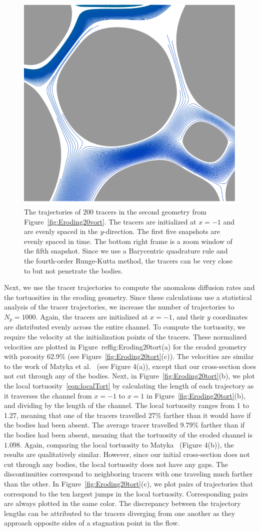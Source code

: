 \documentclass[preprint, 10pt]{elsarticle}
\begin{document}
\begin{figure}[H]
\begin{center}
\includegraphics[width = 0.32 \textwidth]{./figs/tracer_20b270_zoom}
\caption{\label{fig:Eroding20tracer}The trajectories of 200 tracers in
the second geometry from Figure~\ref{fig:Eroding20vort}. The tracers are
initialized at $x=-1$ and are evenly spaced in the $y$-direction. The
first five snapshots are evenly spaced in time.  The bottom right frame
is a zoom window of the fifth snapshot.  Since we use a Barycentric
quadrature rule and the fourth-order Runge-Kutta method, the tracers can
be very close to but not penetrate the bodies.}
\end{center}
\end{figure}

Next, we use the tracer trajectories to compute the anomalous diffusion
rates and the tortuosities in the eroding geometry.  Since these
calculations use a statistical analysis of the tracer trajectories, we
increase the number of trajectories to $N_p = 1000$.  Again, the tracers
are initialized at $x=-1$, and their $y$ coordinates are distributed
evenly across the entire channel.  To compute the tortuosity, we
require the velocity at the initialization points of the tracers.  These
normalized velocities are plotted in Figure~ref{fig:Eroding20tort}(a)
for the eroded geometry with porosity 62.9\% (see
Figure~\ref{fig:Eroding20tort}(c)).  The velocities are similar to the
work of Matyka et al.~\cite{matyka2008tortuosity} (see Figure 4(a)),
except that our cross-section does not cut through any of the bodies.
Next, in Figure~\ref{fig:Eroding20tort}(b), we plot the local
tortuosity~\eqref{eqn:localTort} by calculating the length of each
trajectory as it traverses the channel from $x=-1$ to $x=1$ in
Figure~\ref{fig:Eroding20tort}(b), and dividing by the length of the
channel.  The local tortuosity ranges from 1 to 1.27, meaning that one
of the tracers travelled 27\% farther than it would have if the bodies
had been absent.  The average tracer travelled 9.79\% farther than if
the bodies had been absent, meaning that the tortuosity of the eroded
channel is $1.098$.  Again, comparing the local tortuosity to
Matyka~\cite{matyka2008tortuosity} (Figure 4(b)), the results are
qualitatively similar. However, since our initial cross-section does not
cut through any bodies, the local tortuosity does not have any gaps.
The discontinuities correspond to neighboring tracers with one traveling
much farther than the other.  In Figure~\ref{fig:Eroding20tort}(c), we
plot pairs of trajectories that correspond to the ten largest jumps in
the local tortuosity.  Corresponding pairs are always plotted in the
same color.  The discrepancy between the trajectory lengths can be
attributed to the tracers diverging from one another as they approach
opposite sides of a stagnation point in the flow.
\end{document}
